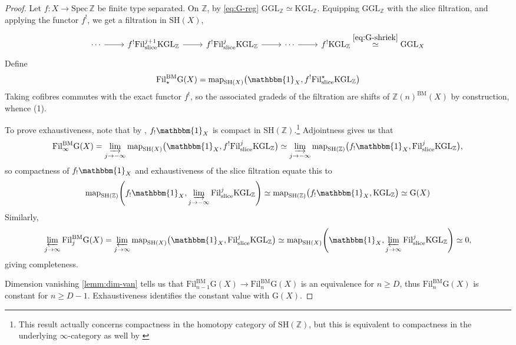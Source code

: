 \documentclass[11pt, twoside]{article}
\numberwithin{equation}{section}
\theoremstyle{definition}
\newcommand{\bb}[1]{\mathbb{#1}}
\newcommand{\colim}{\varinjlim}
\newcommand{\spec}{\mathrm{Spec} \,}
\newcommand{\catlim}{\varprojlim}
\newcommand{\map}{\mathrm{map}}
\newcommand{\fil}{\mathrm{Fil}}
\newcommand{\Kgl}{\mathrm{KGL}}
\newcommand{\Ggl}{\mathrm{GGL}}
\newcommand{\sh}{\mathrm{SH}}
\newcommand{\bm}{\mathrm{BM}}
\newcommand{\G}{\mathrm{G}}
\newcommand{\sli}{\mathrm{slice}}
\begin{document}
\begin{proof}
Let \(f \colon X \to \spec \bb{Z}\) be finite type separated. On \(\bb{Z}\), by \eqref{eq:G-reg} \(\Ggl_\bb{Z} \simeq \Kgl_\bb{Z}\). Equipping \(\Ggl_\bb{Z}\) with the slice filtration, and applying the functor \(f^!\), we get a filtration in \(\sh(X)\), 
\[\begin{tikzcd} \cdots \ar[r] & f^!\fil_\sli^{j + 1} \Kgl_\bb{Z} \ar[r] & f^!\fil_{\sli}^j \Kgl_\bb{Z} \ar[r] & \cdots \ar[r] & f^!\Kgl_\bb{Z} \stackrel{\eqref{eq:G-shriek}} \simeq \mathrm{GGL}_X \end{tikzcd}\]
Define 
\[\fil_\star^\bm \G(X) = \map_{\sh(X)}\big(\mathbbm{1}_X, f^! \fil_\sli^\star \Kgl_\bb{Z}\big)\]
Taking cofibres commutes with the exact functor \(f^!\), so the associated gradeds of the filtration are shifts of \(\bb{Z}(n)^\bm(X)\) by construction, whence (1).

To prove exhaustiveness, note that by \cite[Definition 1.3.6]{BonDeg}, \(f_! \mathbbm{1}_X\) is compact in \(\sh(\bb{Z})\).\footnote{This result actually concerns compactness in the homotopy category of \(\sh(\bb{Z})\), but this is equivalent to compactness in the underlying \(\infty\)-category as well by \cite[Remark 1.4.4.3]{HA}} Adjointness gives us that 
\[\fil_\infty^\bm \G(X) = \colim_{j \to - \infty} \map_{\sh(X)}\big(\mathbbm{1}_X, f^! \fil_\sli^j \Kgl_\bb{Z}\big) \simeq \colim_{j \to - \infty} \map_{\sh(\bb{Z})}\big(f_! \mathbbm{1}_X, \fil_\sli^j \Kgl_\bb{Z} \big),\]
so compactness of \(f_! \mathbbm{1}_X\) and exhaustiveness of the slice filtration \cite[Remark 3.38]{BEM} equate this to 
\[\map_{\sh(\bb{Z})} \! \left(f_! \mathbbm{1}_X, \colim_{j \to - \infty} \fil_\sli^j \Kgl_\bb{Z}\right) \simeq \map_{\sh(\bb{Z})}\big(f_! \mathbbm{1}_X, \Kgl_\bb{Z}\big) \simeq \G(X)\]
Similarly, 
\[\catlim_{j \to \infty} \fil_j^\bm \G(X) = \catlim_{j \to \infty} \map_{\sh(X)}\big(\mathbbm{1}_X, \fil_\sli^j \Kgl_\bb{Z}\big) \simeq \map_{\sh(X)} \!\left(\mathbbm{1}_X, \catlim_{j \to \infty} \fil_\sli^j \Kgl_\bb{Z}\right) \simeq 0,\]
giving completeness.

Dimension vanishing \ref{lemm:dim-van} tells us that \(\fil_{n - 1}^\bm \G(X) \to \fil_n^\bm \G(X)\) is an equivalence for \(n \geq D\), thus \(\fil_n^\bm \G(X)\) is constant for \(n \geq D - 1\). Exhaustiveness identifies the constant value with \(\G(X)\).


\end{proof}
\end{document}
